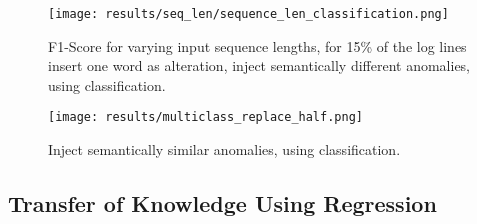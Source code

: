 \begin{figure}[H]
\centering
  \captionsetup{justification=centering}
  \texttt{[image: results/seq\_len/sequence\_len\_classification.png]}\\
  \caption{F1-Score for varying input sequence lengths, for 15\% of the log lines insert one word as alteration, inject semantically different anomalies, using classification.}
  \label{fig:seq_len_classification}
\end{figure}

\begin{figure}[H]
  \centering
  \captionsetup{justification=centering}
  \texttt{[image: results/multiclass\_replace\_half.png]}\\
  \caption{Inject semantically similar anomalies, using classification.}
  \label{fig:replace_words_classification}
\end{figure}







\clearpage
\subsection{Transfer of Knowledge Using Regression \label{sec:results-regression-transfer}}

